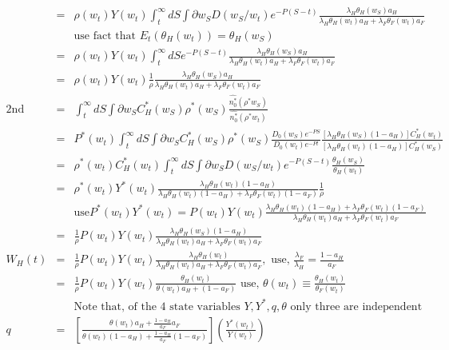 \documentclass[]{article}
\begin{document}
\begin{eqnarray*}
&=& \rho(w_t) Y(w_t) \int_t^\infty dS \int \partial w_S D(w_S/w_t) e^{-P(S-t)} \frac{\lambda_H \theta_H(w_S) a_H}{\lambda_H \theta_H(w_t) a_H + \lambda_F \theta_F (w_t) a_F}\\
&& \mbox{use fact that } E_t(\theta_H(w_t)) = \theta_H(w_S)\\
&=& \rho(w_t) Y(w_t) \int_t^\infty dS e^{-P(S-t)} \frac{\lambda_H \theta_H(w_S) a_H}{\lambda_H \theta_H(w_t) a_H + \lambda_F \theta_F (w_t) a_F}\\
&=& \rho (w_t) Y(w_t) \frac{1}{\rho} \frac{\lambda_H \theta_H(w_S) a_H}{\lambda_H \theta_H(w_t) a_H + \lambda_F \theta_F (w_t) a_F}\\
\mbox{2nd term} &=& \int_t^\infty dS \int \partial w_S C_H^*(w_S)\rho^* (w_S) \frac{\hat{n_0^*}(\rho^* w_S)}{\hat{n_0^*}(\rho^* w_t)}\\
&=& P^*(w_t)\int_t^\infty dS \int \partial w_S C_H^*(w_S)\rho^* (w_S) \frac{D_0(w_S)e^{-PS}}{D_0(w_t)e^{-Pt}} \frac{[\lambda_H \theta_H(w_S) (1-a_H)]C_H^*(w_t)}{[\lambda_H \theta_H(w_t) (1-a_H)] C_H^*(w_S)}\\
&=& \rho^*(w_t) C_H^*(w_t) \int_t^\infty dS \int \partial w_S D(w_S/w_t) e^{-P(S-t)} \frac{\theta_H(w_S)}{\theta_H(w_t)}\\
&=& \rho^*(w_t) Y^*(w_t) \frac{\lambda_H \theta_H(w_t)(1-a_H)}{\lambda_H \theta_H(w_t) (1-a_H) + \lambda_F \theta_F (w_t)(1-a_F)}\frac{1}{\rho}\\
&& \mbox{use} P^*(w_t) Y^*(w_t) = P(w_t)Y(w_t) \frac{\lambda_H \theta_H(w_t)(1-a_H)+\lambda_F \theta_F(w_t)(1-a_F)}{\lambda_H\theta_H(w_t)a_H + \lambda_F \theta_F(w_t)a_F}\\
&=& \frac{1}{\rho}P(w_t) Y(w_t) \frac{\lambda_H \theta_H(w_S) (1-a_H)}{\lambda_H \theta_H(w_t) a_H + \lambda_F \theta_F (w_t) a_F}\\
W_H(t) &=& \frac{1}{\rho} P(w_t)Y(w_t) \frac{\lambda_H \theta_H (w_t)}{\lambda_H \theta_H (w_t) a_H + \lambda_F \theta_F(w_t)a_F}, \mbox{ use, } \frac{\lambda_F}{\lambda_H} = \frac{1-a_H}{a_F}\\
&=& \frac{1}{\rho} P(w_t)Y(w_t) \frac{\theta_H (w_t)}{\theta (w_t) a_H + (1-a_F)} \mbox{ use, } \theta(w_t) \equiv \frac{\theta_H(w_t)}{\theta_F(w_t)}\\
&& \mbox{Note that, of the 4 state variables $Y, Y^*, q, \theta$ only three are independent} \\
q &=& \left[\frac{\theta(w_t)a_H + \frac{1-a_H}{a_F}a_F}{\theta(w_t)(1-a_H) + \frac{1-a_H}{a_F} (1-a_F)}\right] \left(\frac{Y^*(w_t)}{Y(w_t)}\right)\\

\end{eqnarray*}
\end{document}
